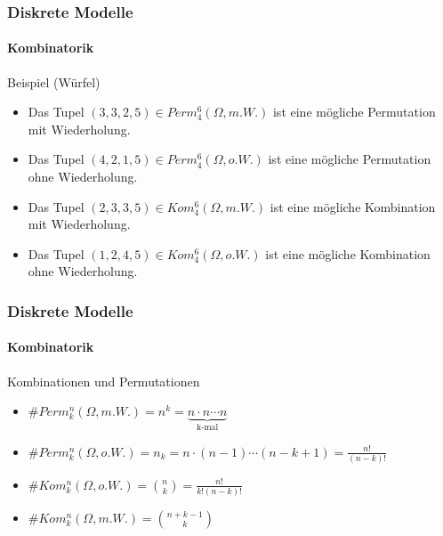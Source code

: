 \documentclass{beamer}
\begin{document}
\begin{frame}
    \frametitle{Diskrete Modelle}
\framesubtitle{Kombinatorik}

\begin{block}{Beispiel (Würfel)}
\begin{itemize}
\item Das Tupel $ (3,3,2,5 )  \in Perm_4^6(\Omega, m.W.)$ ist eine mögliche Permutation mit Wiederholung.
\item Das Tupel $ (4,2,1,5 ) \in Perm_4^6(\Omega, o.W.)$ ist eine mögliche Permutation ohne Wiederholung.
\item Das Tupel $ (2,3,3,5 )  \in Kom_4^6(\Omega, m.W.)$ ist eine mögliche Kombination mit Wiederholung.
\item Das Tupel $(1,2,4,5) \in Kom_4^6(\Omega, o.W.)$ ist eine mögliche Kombination ohne Wiederholung.

\end{itemize}

\end{block}
 \end{frame}



\begin{frame}
    \frametitle{Diskrete Modelle}
\framesubtitle{Kombinatorik}

\begin{block}{Kombinationen und Permutationen}
\begin{itemize}
\item $\# Perm_k^n(\Omega, m.W.)  = n^k = \underbrace{n \cdot n \cdots n}_{\text{k-mal}}$
\item $\# Perm_k^n(\Omega, o.W.)  = n_k = n \cdot (n-1) \cdots  (n-k+1) = \frac{n!}{(n-k)!}$  
\item $\#Kom_k^n(\Omega, o.W.) = \binom{n}{k} = \frac{n!}{k! (n-k)!}$  
\item $\#Kom_k^n(\Omega, m.W.)  = \binom{n + k -1}{k}$  
\end{itemize}
\end{block}
 \end{frame}
\end{document}
